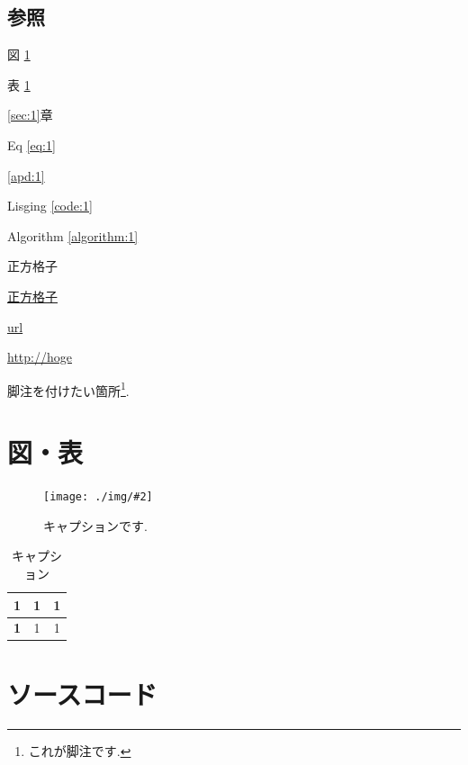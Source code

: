 \documentclass[11pt,a4paper, titlepage]{ltjsarticle}
\let\origsection\section
\let\origsubsection\subsection
\newcommand{\chapter}{\origsection}
\renewcommand{\section}{\origsubsection}
\renewcommand{\subsection}{\subsubsection}
\renewcommand{\figurename}{図 }
\renewcommand{\tablename}{表 }
\newcommand{\記}{\begin{center} 記 \end{center}}
\newcommand{\挨拶}{\noindent 拝啓 \ifcase\month\or 厳寒\or 春寒\or 早春
    \or 陽寒\or 新緑\or 向暑\or 猛暑\or 残暑\or 初秋\or 仲秋\or 晩秋\or 初冬
    \fi の候, ますますご清栄のこととお喜び申し上げます.}
\newcommand{\refSec}[1]   {\ref{#1}章}
\newcommand{\refApd}[1]   {\ref{#1}}
\newcommand{\refFig}[1]   {\figurename\ref{#1}}
\newcommand{\refTable}[1] {\tablename\ref{#1}}
\newcommand{\refEq}[1]    {Eq \ref{#1}}
\newcommand{\refCode}[1]    {Lisging \ref{#1}}
\newcommand{\refAlgorithm}[1]    {Algorithm \ref{#1}}
\newcommand{\myfig}[3]{\begin{figure}[H]\centering\texttt{[image: ./img/\#2]}\caption{#3\label{fig:#2}}\end{figure}}
\newcommand{\mytable}[5]{\begin{table}[H] \centering 
    \renewcommand{\arraystretch}{0.8} \begin{tabular}{#1} 
        \toprule #2 \midrule #3 \bottomrule \end{tabular} 
        \caption{#4 \label{#5}} \renewcommand{\arraystretch}{1} \end{table}}
\begin{document}
\section{参照}
\refFig{fig:template.png}\par
\refTable{table:1}\par
\refSec{sec:1}\par
\refEq{eq:1}\par
\refApd{apd:1}\par
\refCode{code:1}\par
\refAlgorithm{algorithm:1} \par
\hypertarget{square}{正方格子}\par
\hyperlink{square}{正方格子}\par
\href{http://hoge}{url}\par
\url{http://hoge}\par
\cite{Plumer_1988} \par
\cite{Plumer_1989} \par
脚注を付けたい箇所\footnote{これが脚注です.}.
\chapter{図・表}
\myfig{12}{template.png}{キャプションです.}
\mytable{lcc}
{\textbf{1} & \textbf{1} & \textbf{1} \\ }
{\textbf{1} & 1  & 1  \\ }
{キャプション}
{table:1}


\chapter{ソースコード} %


\end{document}
